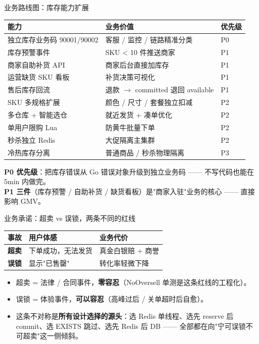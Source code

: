 \documentclass[aspectratio=169,11pt]{beamer}
\begin{document}
\begin{frame}[shrink]{业务路线图：库存能力扩展}
\begin{tabular}{@{}lp{5.2cm}l@{}}
\toprule
能力 & 业务价值 & 优先级 \\
\midrule
独立库存业务码 90001/90002 & 客服 / 监控 / 链路精准分类 & P0 \\
库存预警事件 & SKU < 10 件推送商家 & P1 \\
商家自助补货 API & 商家后台直接加库存 & P1 \\
运营缺货 SKU 看板 & 补货决策可视化 & P1 \\
售后库存回流 & 退款 $\to$ committed 退回 available & P1 \\
SKU 多规格扩展 & 颜色 / 尺寸 / 套餐独立扣减 & P2 \\
多仓库 + 智能选仓 & 就近发货 + 凑单优化 & P2 \\
单用户限购 Lua & 防黄牛批量下单 & P2 \\
秒杀独立 Redis & 大促隔离主集群 & P2 \\
冷热库存分离 & 普通商品 / 秒杀物理隔离 & P3 \\
\bottomrule
\end{tabular}
\vspace{2mm}
\small \textbf{P0 优先级}：把库存错误从 Go 错误对象升级到独立业务码 —— 不写代码也能在 5min 内做完。\\
\textbf{P1 三件}（库存预警 / 自助补货 / 缺货看板）是"商家入驻"业务的核心 —— 直接影响 GMV。
\end{frame}

\begin{frame}[shrink]{业务承诺：超卖 vs 误锁，两条不同的红线}
\begin{tabular}{@{}lll@{}}
\toprule
事故 & 用户体感 & 业务代价 \\
\midrule
\textbf{超卖}     & 下单成功，无法发货  & 真金白银赔 + 商誉 \\
\textbf{误锁}     & 显示"已售罄"        & 转化率轻微下降 \\
\bottomrule
\end{tabular}
\vspace{3mm}
\begin{itemize}
  \item 超卖 = 法律 / 合同事件，\textbf{零容忍}（NoOversell 单测是这条红线的工程化）。
  \item 误锁 = 体验事件，\textbf{可以容忍}（高峰过后 / 关单超时后自愈）。
  \item 这条不对称是\textbf{所有设计选择的源头}：选 Redis 单线程、选先 reserve 后 commit、选 EXISTS 跳过、选先 Redis 后 DB —— 全部都在向"宁可误锁不可超卖"这一侧倾斜。
\end{itemize}
\end{frame}
\end{document}
